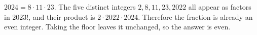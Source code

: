 $ 2024=8\cdot11\cdot23 $. The five distinct integers $ 2,8,11,23,2022 $ all appear as factors in $ 2023!$, and their product is $ 2\cdot2022\cdot2024 $. Therefore the fraction is already an even integer. Taking the floor leaves it unchanged, so the answer is $\boxed{\text{even}}$.

